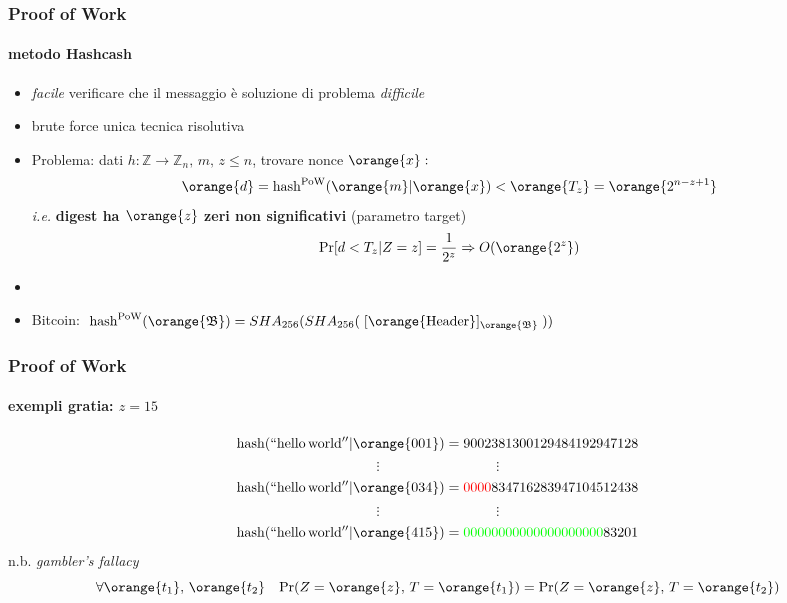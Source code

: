 \begin{frame}
	\frametitle{Proof of Work}
	\framesubtitle{metodo Hashcash}
	
	\begin{itemize}
	  \item \textit{facile} verificare che il messaggio è soluzione di problema \textit{difficile}
	  \item {\color{blue}brute force} unica tecnica risolutiva 
	  \item Problema: dati $h:\mathbb{Z}\rightarrow\mathbb{Z}_n,\,m,\,z \leq n$, trovare nonce $\orange{x}:$
	  		$$\orange{d}=\mathrm{hash}^{\mathrm{PoW}}(\orange{m}|\orange{x}) < \orange{T_z} = \orange{2^{n-z+1}}$$
	   		\textit{i.e.} \textbf{digest ha $\orange{z}$ zeri non significativi}
	   		(parametro {\color{blue}target}) $$\Pr[d<T_z|Z=z]=\frac{1}{2^z} \Rightarrow O(\orange{2^z})$$ %
	  \item {}
	  \item Bitcoin: $\;\mathrm{hash}^{\mathrm{PoW}}(\orange{\mathfrak{B}})
	  					=SHA_{256}(SHA_{256}(\;[\orange{\mathrm{Header}}]_{\orange{\mathfrak{B}}}\;))$
	  \end{itemize}
\end{frame}
\begin{frame}
	\frametitle{Proof of Work}
	\framesubtitle{exempli gratia: $z=15$}	
	 
	$$ \mathrm{hash}(\mathrm{``hello\,world''}|\orange{001})=              9002381300129484192947128  $$
	$$ \vdots \;\;\;\;\;\;\;\;\;\;\;\;\;\;\;\;\;\;\;\;\;\;\;\;\;\;\;\;\;\; \vdots$$
	$$ \mathrm{hash}(\mathrm{``hello\,world''}|\orange{034})={\color{red}0000}834716283947104512438 $$
	$$ \vdots \;\;\;\;\;\;\;\;\;\;\;\;\;\;\;\;\;\;\;\;\;\;\;\;\;\;\;\;\;\; \vdots$$
	$$ \mathrm{hash}(\mathrm{``hello\,world''}|\orange{415})={\color{green}00000000000000000000}83201 $$
	\newline
	{\color{blue}n.b.} \textit{gambler's fallacy}
	$$\forall \orange{t_1},\,\orange{t_2} \;\;\; \Pr(Z=\orange{z},\,T=\orange{t_1})=\Pr(Z=\orange{z},\,T=\orange{t_2})$$

\end{frame}
